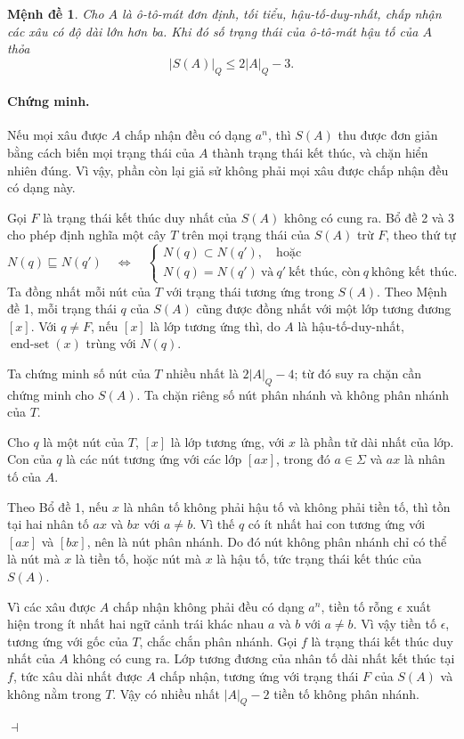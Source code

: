\documentclass[11pt]{article}
\newtheorem{proposition}{Mệnh đề}
\newenvironment{proof}{\paragraph{Chứng minh.}}{\hfill$\dashv$\par}
\newcommand{\eps}{\epsilon}
\newcommand{\End}{\operatorname{end\text{-}set}}
\begin{document}
\begin{proposition}
Cho $A$ là ô-tô-mát đơn định, tối tiểu, hậu-tố-duy-nhất, chấp nhận các xâu có
độ dài lớn hơn ba. Khi đó số trạng thái của ô-tô-mát hậu tố của $A$ thỏa
\[
  |S(A)|_Q \le 2|A|_Q-3.
\tag{4}
\]
\end{proposition}

\begin{proof}
Nếu mọi xâu được $A$ chấp nhận đều có dạng $a^n$, thì $S(A)$ thu được đơn giản
bằng cách biến mọi trạng thái của $A$ thành trạng thái kết thúc, và chặn hiển
nhiên đúng. Vì vậy, phần còn lại giả sử không phải mọi xâu được chấp nhận đều
có dạng này.

Gọi $F$ là trạng thái kết thúc duy nhất của $S(A)$ không có cung ra. Bổ đề 2
và 3 cho phép định nghĩa một cây $T$ trên mọi trạng thái của $S(A)$ trừ $F$,
theo thứ tự
\[
  N(q)\sqsubseteq N(q')
  \quad\Longleftrightarrow\quad
  \begin{cases}
    N(q)\subset N(q'),\quad\text{hoặc}\\
    N(q)=N(q')\ \text{và}\ q'\ \text{kết thúc, còn}\ q\ \text{không kết thúc.}
  \end{cases}
\tag{5}
\]
Ta đồng nhất mỗi nút của $T$ với trạng thái tương ứng trong $S(A)$. Theo Mệnh
đề 1, mỗi trạng thái $q$ của $S(A)$ cũng được đồng nhất với một lớp tương
đương $[x]$. Với $q\ne F$, nếu $[x]$ là lớp tương ứng thì, do $A$ là
hậu-tố-duy-nhất, $\End(x)$ trùng với $N(q)$.

Ta chứng minh số nút của $T$ nhiều nhất là $2|A|_Q-4$; từ đó suy ra chặn cần
chứng minh cho $S(A)$. Ta chặn riêng số nút phân nhánh và không phân nhánh
của $T$.

Cho $q$ là một nút của $T$, $[x]$ là lớp tương ứng, với $x$ là phần tử dài nhất
của lớp. Con của $q$ là các nút tương ứng với các lớp $[ax]$, trong đó
$a\in\Sigma$ và $ax$ là nhân tố của $A$.

Theo Bổ đề 1, nếu $x$ là nhân tố không phải hậu tố và không phải tiền tố, thì
tồn tại hai nhân tố $ax$ và $bx$ với $a\ne b$. Vì thế $q$ có ít nhất hai con
tương ứng với $[ax]$ và $[bx]$, nên là nút phân nhánh. Do đó nút không phân
nhánh chỉ có thể là nút mà $x$ là tiền tố, hoặc nút mà $x$ là hậu tố, tức trạng
thái kết thúc của $S(A)$.

Vì các xâu được $A$ chấp nhận không phải đều có dạng $a^n$, tiền tố rỗng
$\eps$ xuất hiện trong ít nhất hai ngữ cảnh trái khác nhau $a$ và $b$ với
$a\ne b$. Vì vậy tiền tố $\eps$, tương ứng với gốc của $T$, chắc chắn phân
nhánh. Gọi $f$ là trạng thái kết thúc duy nhất của $A$ không có cung ra. Lớp
tương đương của nhân tố dài nhất kết thúc tại $f$, tức xâu dài nhất được $A$
chấp nhận, tương ứng với trạng thái $F$ của $S(A)$ và không nằm trong $T$.
Vậy có nhiều nhất $|A|_Q-2$ tiền tố không phân nhánh.


\end{proof}
\end{document}
